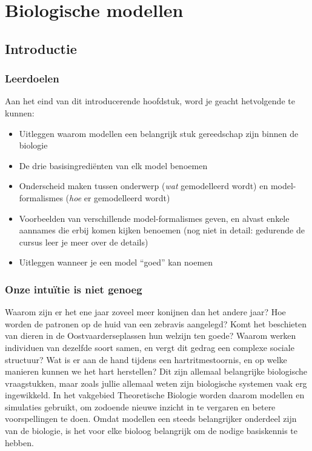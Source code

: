 \documentclass[
  a4paper,
]{scrbook}
\providecommand{\tightlist}{%
  \setlength{\itemsep}{0pt}\setlength{\parskip}{0pt}}\usepackage{longtable,booktabs,array}
\theoremstyle{definition}
\theoremstyle{remark}
\begin{document}
\part{Biologische modellen}

\chapter{Introductie}\label{sec-tbintro}

\section{Leerdoelen}\label{leerdoelen-1}

Aan het eind van dit introducerende hoofdstuk, word je geacht
hetvolgende te kunnen:

\begin{itemize}
\tightlist
\item
  Uitleggen waarom modellen een belangrijk stuk gereedschap zijn binnen
  de biologie
\item
  De drie basisingrediënten van elk model benoemen
\item
  Onderscheid maken tussen onderwerp (\emph{wat} gemodelleerd wordt) en
  model-formalismes (\emph{hoe} er gemodelleerd wordt)
\item
  Voorbeelden van verschillende model-formalismes geven, en alvast
  enkele aannames die erbij komen kijken benoemen (nog niet in detail:
  gedurende de cursus leer je meer over de details)
\item
  Uitleggen wanneer je een model ``goed'' kan noemen
\end{itemize}

\section{Onze intuïtie is niet
genoeg}\label{onze-intuuxeftie-is-niet-genoeg}

Waarom zijn er het ene jaar zoveel meer konijnen dan het andere jaar?
Hoe worden de patronen op de huid van een zebravis aangelegd? Komt het
beschieten van dieren in de Oostvaarderseplassen hun welzijn ten goede?
Waarom werken individuen van dezelfde soort samen, en vergt dit gedrag
een complexe sociale structuur? Wat is er aan de hand tijdens een
hartritmestoornis, en op welke manieren kunnen we het hart herstellen?
Dit zijn allemaal belangrijke biologische vraagstukken, maar zoals
jullie allemaal weten zijn biologische systemen vaak erg ingewikkeld. In
het vakgebied Theoretische Biologie worden daarom modellen en simulaties
gebruikt, om zodoende nieuwe inzicht in te vergaren en betere
voorspellingen te doen. Omdat modellen een steeds belangrijker onderdeel
zijn van de biologie, is het voor elke bioloog belangrijk om de nodige
basiskennis te hebben.
\end{document}
